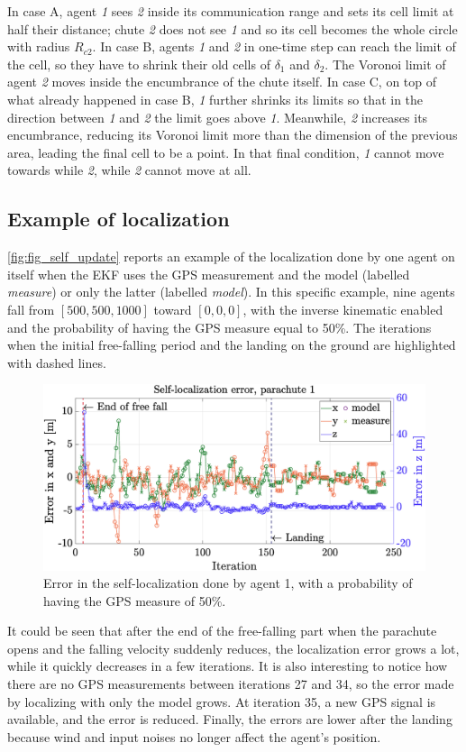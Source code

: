 In case A, agent \textit{1} sees \textit{2} inside its communication range and sets its cell limit at half their distance; chute \textit{2} does not see \textit{1} and so its cell becomes the whole circle with radius $R_{c2}$. In case B, agents \textit{1} and \textit{2} in one-time step can reach the limit of the cell, so they have to shrink their old cells of $\delta_1$ and $\delta_2$. The Voronoi limit of agent \textit{2} moves inside the encumbrance of the chute itself. In case C, on top of what already happened in case B, \textit{1} further shrinks its limits so that in the direction between \textit{1} and \textit{2} the limit goes above \textit{1}. Meanwhile, \textit{2} increases its encumbrance, reducing its Voronoi limit more than the dimension of the previous area, leading the final cell to be a point. In that final condition, \textit{1} cannot move towards while \textit{2}, while \textit{2} cannot move at all.

\subsection{Example of localization}\label{subsec:ex_localization}
\autoref{fig:fig_self_update} reports an example of the localization done by one agent on itself when the EKF uses the GPS measurement and the model (labelled \textit{measure}) or only the latter (labelled \textit{model}). In this specific example, nine agents fall from $[500, 500, 1000]$ toward $[0,0,0]$, with the inverse kinematic enabled and the probability of having the GPS measure equal to 50\%. The iterations when the initial free-falling period and the landing on the ground are highlighted with dashed lines.
\begin{figure}[h]
\centering
\includegraphics[width=\columnwidth]{images/fig_self_update.eps}
\caption{Error in the self-localization done by agent 1, with a probability of having the GPS measure of 50\%.}
\label{fig:fig_self_update}
\end{figure}
It could be seen that after the end of the free-falling part when the parachute opens and the falling velocity suddenly reduces, the localization error grows a lot, while it quickly decreases in a few iterations. It is also interesting to notice how there are no GPS measurements between iterations 27 and 34, so the error made by localizing with only the model grows. At iteration 35, a new GPS signal is available, and the error is reduced. Finally, the errors are lower after the landing because wind and input noises no longer affect the agent's position.
